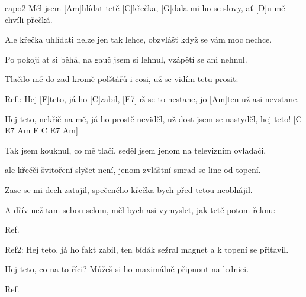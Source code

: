 \hfill capo2
Měl jsem [Am]hlídat tetě [C]křečka, 
[G]dala mi ho se slovy,
ať [D]u mě chvíli přečká. 

Ale křečka uhlídati 
nelze jen tak lehce, obzvlášť 
když se vám moc nechce. 

Po pokoji ať si běhá, 
na gauč jsem si lehnul, 
vzápětí se ani nehnul. 

Tlačilo mě do zad kromě 
polštářů i cosi, 
už se vidím tetu prosit: 

Ref.:
Hej [F]teto, já ho [C]zabil, 
[E7]už se to nestane,
jo [Am]ten už asi nevstane. 

Hej teto, 
nekřič na mě, 
já ho prostě neviděl, 
už dost jsem se nastyděl, 
hej teto!
[C E7 Am F C E7 Am] 
\columnbreak

Tak jsem kouknul, co mě tlačí, 
seděl jsem jenom 
na televizním ovladači, 

ale křeččí švitoření slyšet není, 
jenom zvláštní smrad se line od topení. 

Zase se mi dech zatajil, 
spečeného křečka bych před tetou neobhájil. 

A dřív než tam sebou seknu, 
měl bych asi vymyslet, 
jak tetě potom řeknu: 

Ref.
 
Ref2:
Hej teto, 
já ho fakt zabil, 
ten bídák sežral magnet 
a k topení se přitavil. 

Hej teto, 
co na to říci? 
Můžeš si ho maximálně připnout na lednici. 

Ref.

